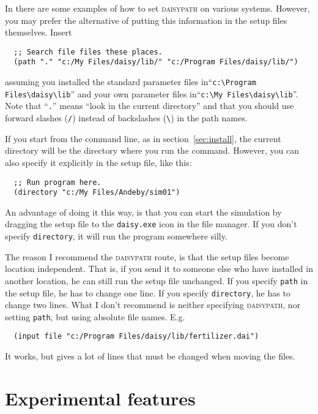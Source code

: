 \documentclass[a4paper,11pt]{article}
\begin{document}
In \cite{dina81} there are some examples of how to set
\textsc{daisypath} on various systems.  However, you may prefer the
alternative of putting this information in the setup files themselves.
Insert
\begin{verbatim}
  ;; Search file files these places.
  (path "." "c:/My Files/daisy/lib/" "c:/Program Files/daisy/lib/")
\end{verbatim}
assuming you installed the \daisy{} standard parameter files
in\linebreak[4] ``\verb|c:\Program Files\daisy\lib|'' and your own
parameter files in\linebreak[4] ``\verb|c:\My Files\daisy\lib|''.
Note that ``\texttt{.}'' means ``look in the current directory'' and
that you should use forward slashes (\verb|/|) instead of backslashes
(\verb|\|) in the path names. %

If you start \daisy{} from the command line, as in
section~\ref{sec:install}, the current directory will be the directory
where you run the command.  However, you can also specify it
explicitly in the setup file, like this:
\begin{verbatim}
  ;; Run program here.
  (directory "c:/My Files/Andeby/sim01")
\end{verbatim}
An advantage of doing it this way, is that you can start the simulation
by dragging the setup file to the \texttt{daisy.exe} icon in the file
manager.  If you don't specify \texttt{directory}, it will run the
program somewhere silly.

The reason I recommend the \textsc{daisypath} route, is that the setup
files become location independent.  That is, if you send it to someone
else who have installed \daisy{} in another location, he can still run
the setup file unchanged.  If you specify \texttt{path} in the setup
file, he has to change one line.  If you specify \texttt{directory},
he has to change two lines.  What I don't recommend is neither
specifying \textsc{daisypath}, nor setting \texttt{path}, but using
absolute file names.  E.g.
\begin{verbatim}
  (input file "c:/Program Files/daisy/lib/fertilizer.dai")
\end{verbatim}
It works, but gives a lot of lines that must be changed when moving
the files.

\appendix

\section{Experimental features}
\label{sec:exp}
\end{document}
